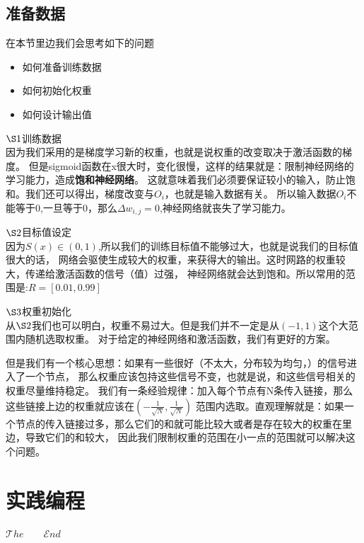 \documentclass[12pt]{article}
\begin{document}
    \subsection{准备数据}
    在本节里边我们会思考如下的问题
    \begin{itemize}
        \item 如何准备训练数据
        \item 如何初始化权重
        \item 如何设计输出值
    \end{itemize}

    $\S1$训练数据\\
    因为我们采用的是梯度学习新的权重，也就是说权重的改变取决于激活函数的梯度。
    但是sigmoid函数在x很大时，变化很慢，这样的结果就是：限制神经网络的学习能力，造成\textbf{饱和神经网络}。
    这就意味着我们必须要保证较小的输入，防止饱和。我们还可以得出，梯度改变与$O_i$，也就是输入数据有关。
    所以输入数据$O_i$不能等于0,一旦等于0，那么$\Delta w_{i,j}=0$,神经网络就丧失了学习能力。
    
    $\S2$目标值设定\\
    因为$S(x)\in (0,1)$,所以我们的训练目标值不能够过大，也就是说我们的目标值很大的话，
    网络会驱使生成较大的权重，来获得大的输出。这时网路的权重较大，传递给激活函数的信号（值）过强，
    神经网络就会达到饱和。所以常用的范围是:$R = [0.01,0.99]$

    $\S3$权重初始化\\
    从$\S2$我们也可以明白，权重不易过大。但是我们并不一定是从$(-1,1)$这个大范围内随机选取权重。
    对于给定的神经网络和激活函数，我们有更好的方案。

    但是我们有一个核心思想：如果有一些很好（不太大，分布较为均匀，）的信号进入了一个节点，
    那么权重应该包持这些信号不变，也就是说，和这些信号相关的权重尽量维持稳定。
    我们有一条经验规律：加入每个节点有N条传入链接，那么这些链接上边的权重就应该在$(-\frac{1}{\sqrt{N}},\frac{1}{\sqrt{N}})$
    范围内选取。直观理解就是：如果一个节点的传入链接过多，那么它们的和就可能比较大或者是存在较大的权重在里边，导致它们的和较大，
    因此我们限制权重的范围在小一点的范围就可以解决这个问题。

    \section{实践编程}
    \vspace{12em}
    \begin{center}
        \Huge
        $\mathscr{T}he\qquad \mathscr{E}nd$
    \end{center}
\end{document}

